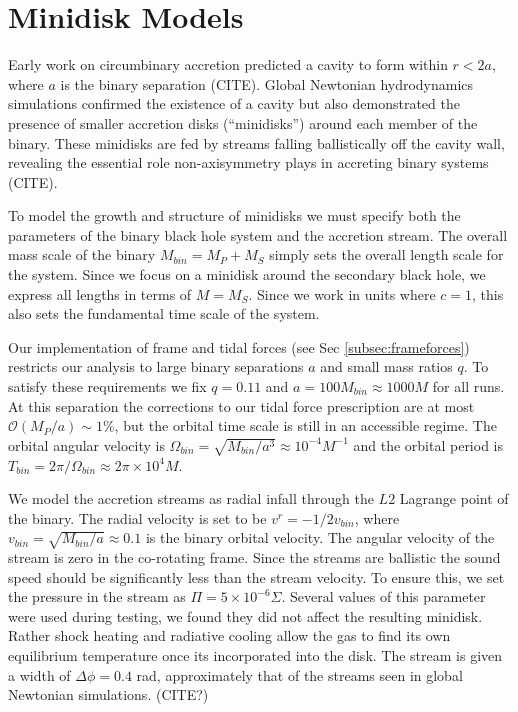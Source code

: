 \documentclass{emulateapj}
\newcommand{\De}{\Delta}
\newcommand{\Sig}{\Sigma}
\newcommand{\Om}{\Omega}
\newcommand{\OO}{\mathcal{O}}
\begin{document}

\section{Minidisk Models}
\label{sec:models}

Early work on circumbinary accretion predicted a cavity to form within $r<2a$, where $a$ is the binary separation (CITE). Global Newtonian hydrodynamics simulations confirmed the existence of a cavity but also demonstrated the presence of smaller accretion disks (``minidisks'') around each member of the binary.  These minidisks are fed by streams falling ballistically off the cavity wall, revealing the essential role non-axisymmetry plays in accreting binary systems (CITE).

To model the growth and structure of minidisks we must specify both the parameters of the binary black hole system and the accretion stream.  The overall mass scale of the binary $M_{bin} = M_P+M_S$ simply sets the overall length scale for the system.  Since we focus on a minidisk around the secondary black hole, we express all lengths in terms of $M = M_S$.  Since we work in units where $c=1$, this also sets the fundamental time scale of the system.  

Our implementation of frame and tidal forces (see Sec \ref{subsec:frameforces}) restricts our analysis to large binary separations $a$ and small mass ratios $q$.  To satisfy these requirements we fix $q=0.11$ and $a = 100 M_{bin} \approx 1000 M$ for all runs.  At this separation the corrections to our tidal force prescription are at most $\OO({M_P / a}) \sim 1\%$, but the orbital time scale is still in an accessible regime.  The orbital angular velocity is $\Om_{bin} = \sqrt{M_{bin} / a^3} \approx 10^{-4} M^{-1}$ and the orbital period is $T_{bin} = 2\pi / \Om_{bin} \approx 2 \pi \times 10^4 M$.

We model the accretion streams as radial infall through the $L2$ Lagrange point of the binary.  The radial velocity is set to be $v^r = -1/2 v_{bin}$, where $v_{bin} = \sqrt{M_{bin}/a} \approx 0.1$ is the binary orbital velocity.  The angular velocity of the stream is zero in the co-rotating frame.  Since the streams are ballistic the sound speed should be significantly less than the stream velocity.  To ensure this, we set the pressure in the stream as $\Pi = 5 \times 10^{-6} \Sig$.  Several values of this parameter were used during testing, we found they did not affect the resulting minidisk. Rather shock heating and radiative cooling allow the gas to find its own equilibrium temperature once its incorporated into the disk.  The stream is given a width of $ \De \phi = 0.4$ rad, approximately that of the streams seen in global Newtonian simulations. (CITE?)
\end{document}
